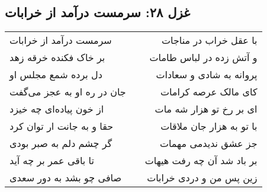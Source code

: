 \begin{center}
\section*{غزل ۲۸: سرمست درآمد از خرابات}
\label{sec:028}
\begin{longtable}{l p{0.5cm} r}
سرمست درآمد از خرابات
&&
با عقل خراب در مناجات
\\
بر خاک فکنده خرقه زهد
&&
و آتش زده در لباس طامات
\\
دل برده شمع مجلس او
&&
پروانه به شادی و سعادات
\\
جان در ره او به عجز می‌گفت
&&
کای مالک عرصه کرامات
\\
از خون پیاده‌ای چه خیزد
&&
ای بر رخ تو هزار شه مات
\\
حقا و به جانت ار توان کرد
&&
با تو به هزار جان ملاقات
\\
گر چشم دلم به صبر بودی
&&
جز عشق ندیدمی مهمات
\\
تا باقی عمر بر چه آید
&&
بر باد شد آن چه رفت هیهات
\\
صافی چو بشد به دور سعدی
&&
زین پس من و دردی خرابات
\\
\end{longtable}
\end{center}
